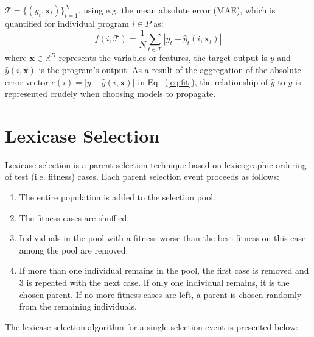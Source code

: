 \documentclass[preprint]{article}
\begin{document}
$\mathcal{T} = \{ (y_t,\mathbf{x}_t)\}_{t = 1}^N$, using e.g. the mean absolute error (MAE), which is quantified for individual program $i \in P$ as:
\begin{equation}
f(i,\mathcal{T}) = \frac{1}{N} \sum_{t \in \mathcal{T}}{|y_t - \hat{y}_t(i,\mathbf{x}_t)|} \label{eq:fit} 
\end{equation}
where $\mathbf{x} \in \mathbb{R}^D$ represents the variables or features, the target output is $y$ and $\hat{y}(i,\mathbf{x})$ is the program's output. As a result of the aggregation of the absolute error vector $e(i) = |y - \hat{y}(i,\mathbf{x})|$ in Eq.~(\ref{eq:fit}), the relationship of $\hat{y}$ to $y$ is represented crudely when choosing models to propagate.

\section{Lexicase Selection}\label{s:2}
Lexicase selection is a parent selection technique based on lexicographic ordering of test (i.e. fitness) cases.  Each parent selection event proceeds as follows: 

\begin{enumerate}
\item The entire population is added to the selection pool.
\item The fitness cases are shuffled.
\item Individuals in the pool with a fitness worse than the best fitness on this case among the pool are removed. 
\item If more than one individual remains in the pool, the first case is removed and 3 is repeated with the next case. If only one individual remains, it is the chosen parent. If no more fitness cases are left, a parent is chosen randomly from the remaining individuals. 
\end{enumerate}

The lexicase selection algorithm for a single selection event is presented below: 
\end{document}
